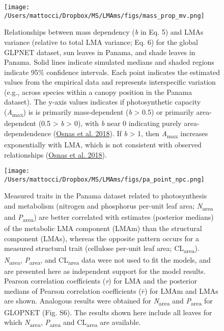 \documentclass[
  12pt,
  letterpaper,
  DIV=11,
  numbers=noendperiod]{scrartcl}
\begin{document}
\begin{figure}

{\centering \texttt{[image: /Users/mattocci/Dropbox/MS/LMAms/figs/mass\_prop\_mv.png]}

}

\caption{\label{fig-mass_prop}Relationships between mass dependency
(\emph{b} in Eq. 5) and LMAs variance (relative to total LMA variance;
Eq. 6) for the global GLPNET dataset, sun leaves in Panama, and shade
leaves in Panama. Solid lines indicate simulated medians and shaded
regions indicate 95\% confidence intervals. Each point indicates the
estimated values from the empirical data and represents interspecific
variation (e.g., across species within a canopy position in the Panama
dataset). The y-axis values indicates if photosynthetic capacity
(\emph{A}\textsubscript{max}) is is primarily mass-dependent (\emph{b}
\textgreater{} 0.5) or primarily area-dependent (0.5 \textgreater{}
\emph{b} \textgreater{} 0), with \emph{b} near 0 indicating purely
area-dependendence (\protect\hyperlink{ref-Osnas2018}{Osnas et al.
2018}). If \emph{b} \textgreater{} 1, then \emph{A}\textsubscript{max}
increases exponentially with LMA, which is not consistent with observed
relationships (\protect\hyperlink{ref-Osnas2018}{Osnas et al. 2018}).}

\end{figure}

\newpage

\begin{figure}

{\centering \texttt{[image: /Users/mattocci/Dropbox/MS/LMAms/figs/pa\_point\_npc.png]}

}

\caption{\label{fig-pa_npc}Measured traits in the Panama dataset related
to photosynthesis and metabolism (nitrogen and phosphorus per-unit leaf
area; \emph{N}\textsubscript{area} and \emph{P}\textsubscript{area}) are
better correlated with estimates (posterior medians) of the metabolic
LMA component (LMAm) than the structural component (LMAs), whereas the
opposite pattern occurs for a measured structural trait (cellulose
per-unit leaf area; CL\textsubscript{area}).
\emph{N}\textsubscript{area}, \emph{P}\textsubscript{area}, and
CL\textsubscript{area} data were not used to fit the models, and are
presented here as independent support for the model results. Pearson
correlation coefficients (\emph{r}) for LMA and the posterior medians of
Pearson correlation coefficients (\(\bar{r}\)) for LMAm and LMAs are
shown. Analogous results were obtained for \emph{N}\textsubscript{area}
and \emph{P}\textsubscript{area} for GLOPNET (Fig. S6). The results
shown here include all leaves for which \emph{N}\textsubscript{area},
\emph{P}\textsubscript{area} and CL\textsubscript{area} are available.}

\end{figure}
\end{document}
